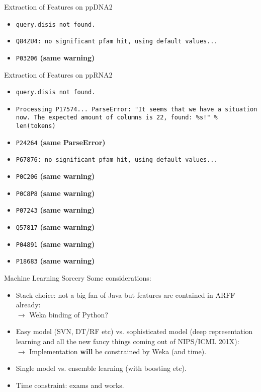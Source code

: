 \documentclass[pdf]
{beamer}
\begin{document}
\begin{frame}{Extraction of Features on ppDNA2}
	\begin{itemize}
		\item \texttt{query.disis not found.}
		\item \texttt{Q84ZU4: no significant pfam hit, using default values...}
		\item \texttt{P03206} \textbf{(same warning)}
	\end{itemize}
\end{frame}

\begin{frame}{Extraction of Features on ppRNA2}
	\begin{itemize}
		\item \texttt{query.disis not found.}
		\item \texttt{Processing P17574... ParseError: "It seems that we have a situation now. The expected amount of columns is 22, found: \%s!" \% len(tokens)}\\
		\item \texttt{P24264} \textbf{(same ParseError)}
		\item \texttt{P67876: no significant pfam hit, using default values...}
		\item \texttt{P0C206} \textbf{(same warning)}
		\item \texttt{P0C8P8} \textbf{(same warning)}
		\item \texttt{P07243} \textbf{(same warning)}
		\item \texttt{Q57817} \textbf{(same warning)}
		\item \texttt{P04891} \textbf{(same warning)}
		\item \texttt{P18683} \textbf{(same warning)}
	\end{itemize}
\end{frame}

\begin{frame}{Machine Learning Sorcery}
	Some considerations:
	\begin{itemize}
		\item Stack choice: not a big fan of Java but features are contained in ARFF already:\\
			$\rightarrow$ Weka binding of Python?
		\item Easy model (SVN, DT/RF etc) vs. sophisticated model (deep representation learning and all the new fancy things coming out of NIPS/ICML 201X):\\
		$\rightarrow$ Implementation \textbf{will} be constrained by Weka (and time).
		
		\item Single model vs. ensemble learning (with boosting etc).
		\item Time constraint: exams and works.
	\end{itemize}
\end{frame}
\end{document}
